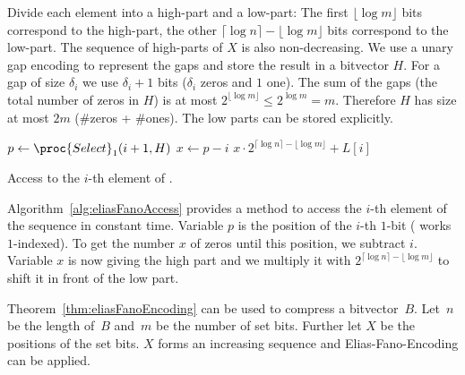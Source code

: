 \begin{Proof}
  Divide each element into a high-part and a low-part: The first $\lfloor \log m \rfloor$ bits correspond to the high-part, the other $\lceil \log n \rceil - \lfloor \log m \rfloor$ bits correspond to the low-part. The sequence of high-parts of $X$ is also non-decreasing. We use a unary gap encoding to represent the gaps and store the result in a bitvector $H$. For a gap of size $\delta_i$ we use $\delta_i + 1$ bits ($\delta_i$ zeros and $1$ one). The sum of the gaps (the total number of zeros in $H$) is at most $2^{\lfloor \log m \rfloor} \leq 2^{\log m} = m$. Therefore $H$ has size at most $2m$ (\#zeros + \#ones). The low parts can be stored explicitly.

  \begin{algorithm}[htb]
    \begin{codebox}
      \li $p \gets \proc{Select}_1(i + 1, H)$
      \li $x \gets p - i$
      \li \Return  $x \cdot 2^{\lceil\log n\rceil - \lfloor\log m\rfloor} + L[i]$
    \end{codebox}
    \caption{Access to the $i$-th element of .}
    \label{alg:eliasFanoAccess}
  \end{algorithm}

  Algorithm~\ref{alg:eliasFanoAccess} provides a method to access the $i$-th element of the sequence in constant time. Variable $p$ is the position of the $i$-th $1$-bit ( works $1$-indexed). To get the number $x$ of zeros until this position, we subtract $i$. Variable $x$ is now giving the high part and we multiply it with $2^{\lceil\log n\rceil - \lfloor\log m\rfloor}$ to shift it in front of the low part.
\end{Proof}

Theorem~\ref{thm:eliasFanoEncoding} can be used to compress a bitvector~$B$. Let~$n$ be the length of~$B$ and~$m$ be the number of set bits. Further let $X$ be the positions of the set bits. $X$ forms an increasing sequence and Elias-Fano-Encoding can be applied.

